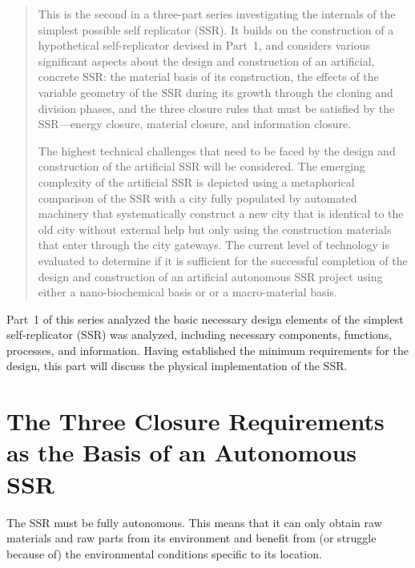 
\begin{abstract}
This is the second in a three-part series investigating the internals 
of the simplest possible self replicator (SSR).  
It builds on the construction of a hypothetical self-replicator devised in 
Part~1, and considers various 
significant aspects about the
design and construction of an artificial, concrete SSR: the material
basis of its construction, the effects of the variable geometry of the
SSR during its growth through the cloning and division phases, and the
three closure rules that must be satisfied by the SSR---energy closure,
material closure, and information closure.

The highest technical
challenges that need to be faced by the design and construction of the
artificial SSR will be considered. The emerging complexity of the artificial
SSR is depicted using a metaphorical comparison of the SSR
with a city fully populated by automated machinery that
systematically construct a new city that is identical
to the old city without external help but only using the
construction materials that enter through the city gateways. 
The current level of technology is evaluated to determine if it is sufficient for the successful completion of the design and construction of an artificial autonomous SSR project using either a nano-biochemical basis or or a macro-material basis.

\end{abstract}

Part~1 of this series analyzed the basic necessary design elements of the simplest self-replicator (SSR) 
was analyzed, including necessary components, functions, processes, and information.
Having established the minimum requirements for the design, this part will discuss the physical implementation
of the SSR.

\section{The Three Closure Requirements as the Basis of an Autonomous SSR}

The SSR must be fully autonomous. This means that it can only obtain raw
materials and raw parts from its environment and benefit from (or
struggle because of) the environmental conditions specific to its
location.

